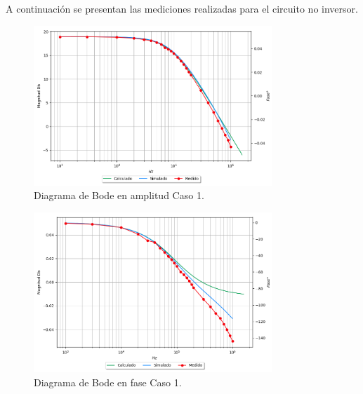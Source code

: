 A continuación se presentan las mediciones realizadas para el circuito no inversor.

\begin{figure}[H]	
	\centering
	\includegraphics[width=0.8\textwidth, trim = {0 0 2cm 0},clip]{Ejercicio1/Imagenes/BodeC1_noinv.png}
	\caption{Diagrama de Bode en amplitud Caso 1.}
	\label{fig:BodeC1_noinv}
\end{figure} 
\begin{figure}[H]	
	\centering
	\includegraphics[width=0.8\textwidth, trim = {2.2cm 0 0 0},clip]{Ejercicio1/Imagenes/BodephC1_noinv.png}
	\caption{Diagrama de Bode en fase Caso 1.}
	\label{fig:BodephC1_noinv}
\end{figure} 

